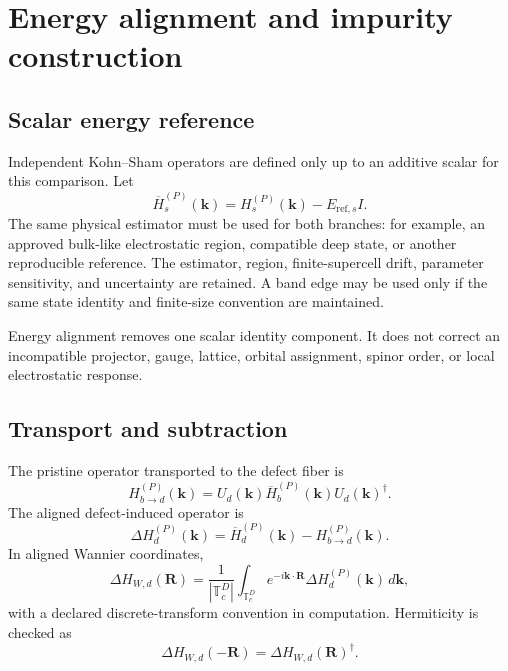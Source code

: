 \documentclass[11pt]{article}
\newenvironment{prospective}{\color{prospectivered}}{}
\begin{document}
\begin{prospective}
\section{Energy alignment and impurity construction}

\subsection{Scalar energy reference}
Independent Kohn--Sham operators are defined only up to an additive scalar for this
comparison. Let
\begin{equation}
 \overline H_s^{(P)}(\mathbf k)
 =H_s^{(P)}(\mathbf k)-E_{\mathrm{ref},s}I.
\end{equation}
The same physical estimator must be used for both branches: for example, an approved
bulk-like electrostatic region, compatible deep state, or another reproducible
reference. The estimator, region, finite-supercell drift, parameter sensitivity, and
uncertainty are retained. A band edge may be used only if the same state identity and
finite-size convention are maintained.

Energy alignment removes one scalar identity component. It does not correct an
incompatible projector, gauge, lattice, orbital assignment, spinor order, or local
electrostatic response.

\subsection{Transport and subtraction}
The pristine operator transported to the defect fiber is
\begin{equation}
 H_{b\rightarrow d}^{(P)}(\mathbf k)
 =U_d(\mathbf k)\overline H_b^{(P)}(\mathbf k)U_d(\mathbf k)^\dagger.
\end{equation}
The aligned defect-induced operator is
\begin{equation}
 \boxed{\Delta H_d^{(P)}(\mathbf k)
 =\overline H_d^{(P)}(\mathbf k)-H_{b\rightarrow d}^{(P)}(\mathbf k)}.
\end{equation}
In aligned Wannier coordinates,
\begin{equation}
 \Delta H_{W,d}(\mathbf R)
 =\frac{1}{|\mathbb T_c^D|}\int_{\mathbb T_c^D}
 e^{-i\mathbf k\cdot\mathbf R}\Delta H_d^{(P)}(\mathbf k)\,d\mathbf k,
\end{equation}
with a declared discrete-transform convention in computation. Hermiticity is checked as
\begin{equation}
 \Delta H_{W,d}(-\mathbf R)=\Delta H_{W,d}(\mathbf R)^\dagger.
\end{equation}


\end{prospective}
\end{document}
